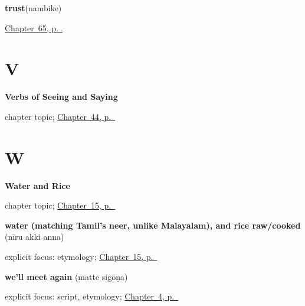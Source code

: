 \noindent\begin{minipage}[t]{\linewidth}
\raggedright
\textbf{trust}\enspace\emph{}\enspace(nambike)\par
\footnotesize \hyperref[ch:ka-manners]{Chapter~65, p.~\pageref*{ch:ka-manners}}
\end{minipage}\par\smallskip

\section*{V}

\noindent\begin{minipage}[t]{\linewidth}
\raggedright
\textbf{Verbs of Seeing and Saying}\par
\footnotesize chapter topic; \hyperref[ch:ka-see-say]{Chapter~44, p.~\pageref*{ch:ka-see-say}}
\end{minipage}\par\smallskip

\section*{W}

\noindent\begin{minipage}[t]{\linewidth}
\raggedright
\textbf{Water and Rice}\par
\footnotesize chapter topic; \hyperref[ch:ka-water-and-rice]{Chapter~15, p.~\pageref*{ch:ka-water-and-rice}}
\end{minipage}\par\smallskip

\noindent\begin{minipage}[t]{\linewidth}
\raggedright
\textbf{water (matching Tamil's neer, unlike Malayalam), and rice raw/cooked}\enspace\emph{  }\enspace(nīru akki anna)\par
\footnotesize explicit focus: etymology; \hyperref[ch:ka-water-and-rice]{Chapter~15, p.~\pageref*{ch:ka-water-and-rice}}
\end{minipage}\par\smallskip

\noindent\begin{minipage}[t]{\linewidth}
\raggedright
\textbf{we'll meet again}\enspace\emph{ }\enspace(matte sigōṇa)\par
\footnotesize explicit focus: script, etymology; \hyperref[ch:farewells]{Chapter~4, p.~\pageref*{ch:farewells}}
\end{minipage}\par\smallskip

